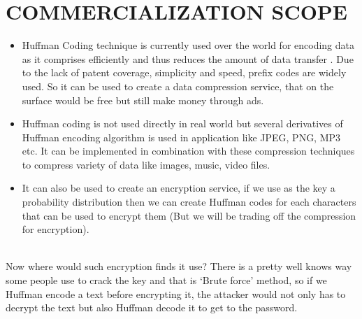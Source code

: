 \documentclass{article}
\begin{document}
\vspace{1cm}

\section{COMMERCIALIZATION SCOPE}

\Large{

\begin{itemize}

  \item Huffman Coding technique is currently used over the world for encoding data as it comprises efficiently and thus reduces the amount of data transfer . Due to the lack of patent coverage, simplicity and speed, prefix codes are widely used. So it can be used to create a data compression service, that on the surface would be free but still make money through ads. \\ 

\item Huffman coding  is not used directly in real world but several derivatives of Huffman encoding algorithm is used in application like JPEG, PNG, MP3 etc. It can be implemented in combination with these compression techniques to compress variety of data like images, music, video files. \\ 

\item It can also be used to create an encryption service, if we use as the key a probability distribution then we can create Huffman codes for each characters that  can be used to encrypt them (But we will be trading off the compression for encryption). \\ \\

\end{itemize}

Now where would such encryption finds it use? There is a pretty well knows way some people use to crack the key and that is ‘Brute force’ method, so if we Huffman encode a text before encrypting it, the attacker would not only has to decrypt the text but also Huffman decode it to get to the password.
}
\end{document}
